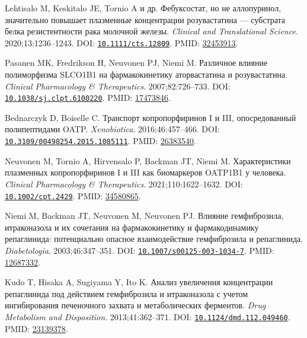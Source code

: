 \documentclass[11pt]{article}
\begin{document}
\begin{description}[before={\microtypesetup{expansion=false}\setlength{\RaggedRightRightskip}{0pt plus 4em}\RaggedRight}]
\item[{[50]}] Lehtisalo M, Keskitalo JE, Tornio A и др. Фебуксостат, но не аллопуринол, значительно повышает плазменные концентрации розувастатина --- субстрата белка резистентности рака молочной железы. \textit{\foreignlanguage{english}{Clinical and Translational Science}}. 2020;13:1236--1243. DOI: \href{https://doi.org/10.1111/cts.12809}{\nolinkurl{10.1111/cts.12809}}. PMID: \href{https://pubmed.ncbi.nlm.nih.gov/32453913/}{32453913}.
\item[{[51]}] Pasanen MK, Fredrikson H, Neuvonen PJ, Niemi M. Различное влияние полиморфизма SLCO1B1 на фармакокинетику аторвастатина и розувастатина. \textit{\foreignlanguage{english}{Clinical Pharmacology \& Therapeutics}}. 2007;82:726--733. DOI: \href{https://doi.org/10.1038/sj.clpt.6100220}{\nolinkurl{10.1038/sj.clpt.6100220}}. PMID: \href{https://pubmed.ncbi.nlm.nih.gov/17473846/}{17473846}.
\item[{[52]}] Bednarczyk D, Boiselle C. Транспорт копропорфиринов I и III, опосредованный полипептидами OATP. \textit{\foreignlanguage{english}{Xenobiotica}}. 2016;46:457--466. DOI: \href{https://doi.org/10.3109/00498254.2015.1085111}{\nolinkurl{10.3109/00498254.2015.1085111}}. PMID: \href{https://pubmed.ncbi.nlm.nih.gov/26383540/}{26383540}.
\item[{[53]}] Neuvonen M, Tornio A, Hirvensalo P, Backman JT, Niemi M. Характеристики плазменных копропорфиринов I и III как биомаркеров OATP1B1 у человека. \textit{\foreignlanguage{english}{Clinical Pharmacology \& Therapeutics}}. 2021;110:1622--1632. DOI: \href{https://doi.org/10.1002/cpt.2429}{\nolinkurl{10.1002/cpt.2429}}. PMID: \href{https://pubmed.ncbi.nlm.nih.gov/34580865/}{34580865}.
\item[{[54]}] Niemi M, Backman JT, Neuvonen M, Neuvonen PJ. Влияние гемфиброзила, итраконазола и их сочетания на фармакокинетику и фармакодинамику репаглинида: потенциально опасное взаимодействие гемфиброзила и репаглинида. \textit{\foreignlanguage{english}{Diabetologia}}. 2003;46:347--351. DOI: \href{https://doi.org/10.1007/s00125-003-1034-7}{\nolinkurl{10.1007/s00125-003-1034-7}}. PMID: \href{https://pubmed.ncbi.nlm.nih.gov/12687332/}{12687332}.
\item[{[55]}] Kudo T, Hisaka A, Sugiyama Y, Ito K. Анализ увеличения концентрации репаглинида под действием гемфиброзила и итраконазола с учетом ингибирования печеночного захвата и метаболических ферментов. \textit{\foreignlanguage{english}{Drug Metabolism and Disposition}}. 2013;41:362--371. DOI: \href{https://doi.org/10.1124/dmd.112.049460}{\nolinkurl{10.1124/dmd.112.049460}}. PMID: \href{https://pubmed.ncbi.nlm.nih.gov/23139378/}{23139378}.

\end{description}
\end{document}

